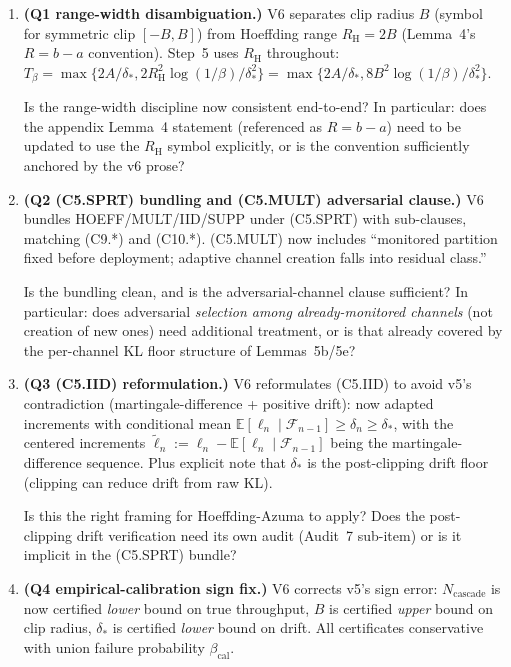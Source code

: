 \documentclass{article}
\newcommand{\deltastar}{\delta_{*}}
\newcommand{\Tbeta}{T_{\beta}}
\newcommand{\Ncasc}{N_{\mathrm{cascade}}}
\newcommand{\bcal}{\beta_{\mathrm{cal}}}
\newcommand{\Bclip}{B}
\newcommand{\Rh}{R_{\mathrm{H}}}
\begin{document}
\begin{enumerate}
\item \textbf{(Q1 range-width disambiguation.)}  V6 separates clip
  radius $\Bclip$ (symbol for symmetric clip $[-\Bclip, \Bclip]$)
  from Hoeffding range $\Rh = 2\Bclip$ (Lemma~4's $R = b - a$
  convention).  Step~5 uses $\Rh$ throughout:
  $\Tbeta = \max\{2A/\deltastar, 2\Rh^2 \log(1/\beta) /
  \deltastar^2\} = \max\{2A/\deltastar, 8\Bclip^2 \log(1/\beta) /
  \deltastar^2\}$.

  Is the range-width discipline now consistent end-to-end?  In
  particular: does the appendix Lemma~4 statement (referenced as
  $R = b - a$) need to be updated to use the $\Rh$ symbol
  explicitly, or is the convention sufficiently anchored by the
  v6 prose?

\item \textbf{(Q2 (C5.SPRT) bundling and (C5.MULT) adversarial
  clause.)}  V6 bundles HOEFF/MULT/IID/SUPP under (C5.SPRT) with
  sub-clauses, matching (C9.*) and (C10.*).  (C5.MULT) now
  includes ``monitored partition fixed before deployment; adaptive
  channel creation falls into residual class.''

  Is the bundling clean, and is the adversarial-channel clause
  sufficient?  In particular: does adversarial \emph{selection
  among already-monitored channels} (not creation of new ones)
  need additional treatment, or is that already covered by the
  per-channel KL floor structure of Lemmas~5b/5e?

\item \textbf{(Q3 (C5.IID) reformulation.)}  V6 reformulates
  (C5.IID) to avoid v5's contradiction (martingale-difference +
  positive drift): now adapted increments with conditional mean
  $\mathbb{E}[\ell_n \mid \mathcal{F}_{n-1}] \geq \delta_n \geq
  \deltastar$, with the centered increments
  $\tilde\ell_n := \ell_n - \mathbb{E}[\ell_n \mid
  \mathcal{F}_{n-1}]$ being the martingale-difference sequence.
  Plus explicit note that $\deltastar$ is the post-clipping drift
  floor (clipping can reduce drift from raw KL).

  Is this the right framing for Hoeffding-Azuma to apply?  Does
  the post-clipping drift verification need its own audit
  (Audit~7 sub-item) or is it implicit in the (C5.SPRT) bundle?

\item \textbf{(Q4 empirical-calibration sign fix.)}  V6 corrects
  v5's sign error: $\Ncasc$ is now certified \emph{lower} bound
  on true throughput, $\Bclip$ is certified \emph{upper} bound on
  clip radius, $\deltastar$ is certified \emph{lower} bound on
  drift.  All certificates conservative with union failure
  probability $\bcal$.


\end{enumerate}
\end{document}
